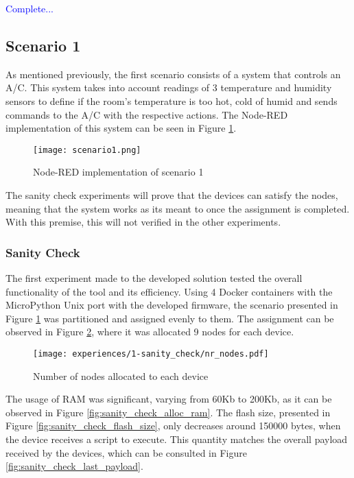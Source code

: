 \textcolor{blue}{Complete...}

\subsection{Scenario 1}\label{sec:discussion_scenario1}

As mentioned previously, the first scenario consists of a system that controls an A/C. This system takes into account readings of 3 temperature and humidity sensors to define if the room's temperature is too hot, cold of humid and sends commands to the A/C with the respective actions. The Node-RED implementation of this system can be seen in Figure \ref{fig:scenario1_node_red}.

\begin{figure}[h]
\centering
\texttt{[image: scenario1.png]}
\caption[Node-RED implementation of scenario 1]{Node-RED implementation of scenario 1}\label{fig:scenario1_node_red}
\end{figure}

The sanity check experiments will prove that the devices can satisfy the nodes, meaning that the system works as its meant to once the assignment is completed. With this premise, this will not verified in the other experiments.


\subsubsection{Sanity Check}

The first experiment made to the developed solution tested the overall functionality of the tool and its efficiency. Using 4 Docker containers with the MicroPython Unix port with the developed firmware, the scenario presented in Figure \ref{fig:scenario1_node_red} was partitioned and assigned evenly to them. The assignment can be observed in Figure \ref{fig:sanity_check_nr_nodes}, where it was allocated 9 nodes for each device.

\begin{figure}[h]
\centering
\texttt{[image: experiences/1-sanity\_check/nr\_nodes.pdf]}
\caption[Number of nodes allocated to each device]{Number of nodes allocated to each device}\label{fig:sanity_check_nr_nodes}
\end{figure}

The usage of RAM was significant, varying from 60Kb to 200Kb, as it can be observed in Figure \ref{fig:sanity_check_alloc_ram}. The flash size, presented in Figure \ref{fig:sanity_check_flash_size}, only decreases around 150000 bytes, when the device receives a script to execute. This quantity matches the overall payload received by the devices, which can be consulted in Figure \ref{fig:sanity_check_last_payload}.

